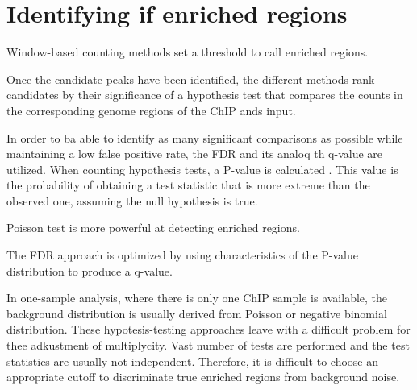 \section{Identifying if enriched regions}

Window-based counting methods set a threshold to call enriched regions.

Once the candidate peaks have been identified, the different methods rank candidates by their significance of a hypothesis test that compares the counts in the corresponding genome regions of the ChIP ands input.

In order to ba able to identify as many significant comparisons as possible while maintaining a low false positive rate, the FDR and its analoq th q-value are utilized.
When counting hypothesis tests, a P-value is calculated .
This value is the probability of obtaining a test statistic that is more extreme than the observed one, assuming the null hypothesis is true.


Poisson test is more powerful at detecting enriched regions.\cite{}




The FDR approach is optimized by using characteristics of the P-value distribution to produce a q-value.


In one-sample analysis, where there is only one ChIP sample is available, the background distribution is usually derived from Poisson or negative binomial distribution.
These hypotesis-testing approaches leave with a difficult problem for thee adkustment of multiplycity.
Vast number of tests are performed and the test statistics are usually not independent.
Therefore, it is difficult to choose an appropriate cutoff to discriminate true enriched regions from background noise.

